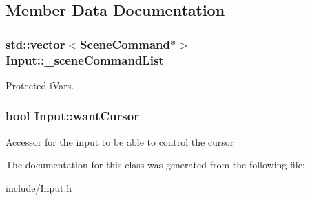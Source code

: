 \subsection{Member Data Documentation}
\hypertarget{class_input_a560f0340c51d4c939c873be86ae8a963}{
\subsubsection[{\_\-sceneCommandList}]{\setlength{\rightskip}{0pt plus 5cm}std::vector$<${\bf SceneCommand}$\ast$$>$ {\bf Input::\_\-sceneCommandList}}}
\label{class_input_a560f0340c51d4c939c873be86ae8a963}
Protected iVars. \hypertarget{class_input_a4578b3d751dd43e66e3623e69d0f45fc}{
\subsubsection[{wantCursor}]{\setlength{\rightskip}{0pt plus 5cm}bool {\bf Input::wantCursor}}}
\label{class_input_a4578b3d751dd43e66e3623e69d0f45fc}
Accessor for the input to be able to control the cursor 

The documentation for this class was generated from the following file:\begin{DoxyCompactItemize}
\item 
include/Input.h\end{DoxyCompactItemize}
